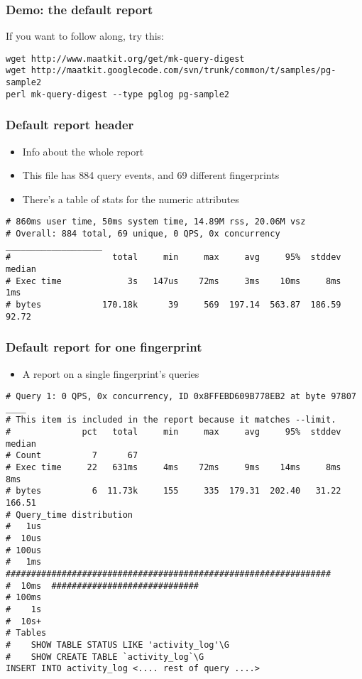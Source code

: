\begin{frame}[fragile]
   \frametitle{Demo: the default report}

   If you want to follow along, try this:

   \scriptsize

\begin{verbatim}
wget http://www.maatkit.org/get/mk-query-digest
wget http://maatkit.googlecode.com/svn/trunk/common/t/samples/pg-sample2
perl mk-query-digest --type pglog pg-sample2
\end{verbatim}

   \normalsize

\end{frame}

\begin{frame}[fragile]
\frametitle{Default report header}
\begin{itemize}
   \item Info about the whole report
   \item This file has 884 query events, and 69 different fingerprints
   \item There's a table of stats for the numeric attributes
\end{itemize}
\scriptsize
\begin{verbatim}
# 860ms user time, 50ms system time, 14.89M rss, 20.06M vsz
# Overall: 884 total, 69 unique, 0 QPS, 0x concurrency ___________________
#                    total     min     max     avg     95%  stddev  median
# Exec time             3s   147us    72ms     3ms    10ms     8ms     1ms
# bytes            170.18k      39     569  197.14  563.87  186.59   92.72
\end{verbatim}
\normalsize
\end{frame}

\begin{frame}[fragile]
\frametitle{Default report for one fingerprint}
\begin{itemize}
   \item A report on a single fingerprint's queries
\end{itemize}
\scriptsize
\begin{verbatim}
# Query 1: 0 QPS, 0x concurrency, ID 0x8FFEBD609B778EB2 at byte 97807 ____
# This item is included in the report because it matches --limit.
#              pct   total     min     max     avg     95%  stddev  median
# Count          7      67
# Exec time     22   631ms     4ms    72ms     9ms    14ms     8ms     8ms
# bytes          6  11.73k     155     335  179.31  202.40   31.22  166.51
# Query_time distribution
#   1us
#  10us
# 100us
#   1ms  ################################################################
#  10ms  #############################
# 100ms
#    1s
#  10s+
# Tables
#    SHOW TABLE STATUS LIKE 'activity_log'\G
#    SHOW CREATE TABLE `activity_log`\G
INSERT INTO activity_log <.... rest of query ....>
\end{verbatim}
\normalsize
\end{frame}

